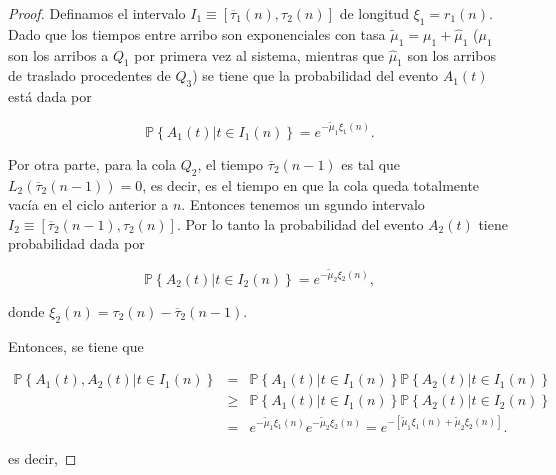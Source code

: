 \documentclass{article}
\newcommand{\prob}{\mathbb{P}}
\numberwithin{equation}{section}
\begin{document}
{\begin{proof}
Definamos el intervalo $I_{1}\equiv\left[\overline{\tau}_{1}\left(n\right),\tau_{2}\left(n\right)\right]$ de longitud $\xi_{1}=r_{1}\left(n\right)$. Dado que los tiempos entre arribo son exponenciales con tasa $\tilde{\mu}_{1}=\mu_{1}+\hat{\mu}_{1}$ ($\mu_{1}$ son los arribos a $Q_{1}$ por primera vez al sistema, mientras que $\hat{\mu}_{1}$ son los arribos de traslado procedentes de $Q_{3}$) se tiene que la probabilidad del evento $A_{1}\left(t\right)$ est\'a dada por 

\begin{equation}
\prob\left\{A_{1}\left(t\right)|t\in I_{1}\left(n\right)\right\}=e^{-\tilde{\mu}_{1}\xi_{1}\left(n\right)}.
\end{equation} 

Por otra parte, para la cola $Q_{2}$, el tiempo $\overline{\tau}_{2}\left(n-1\right)$ es tal que $L_{2}\left(\overline{\tau}_{2}\left(n-1\right)\right)=0$, es decir, es el tiempo en que la cola queda totalmente vac\'ia en el ciclo anterior a $n$. Entonces tenemos un sgundo intervalo $I_{2}\equiv\left[\overline{\tau}_{2}\left(n-1\right),\tau_{2}\left(n\right)\right]$. Por lo tanto la probabilidad del evento $A_{2}\left(t\right)$ tiene probabilidad dada por

\begin{equation}
\prob\left\{A_{2}\left(t\right)|t\in I_{2}\left(n\right)\right\}=e^{-\tilde{\mu}_{2}\xi_{2}\left(n\right)},
\end{equation} 

donde $\xi_{2}\left(n\right)=\tau_{2}\left(n\right)-\overline{\tau}_{2}\left(n-1\right)$.



Entonces, se tiene que

\begin{eqnarray*}
\prob\left\{A_{1}\left(t\right),A_{2}\left(t\right)|t\in I_{1}\left(n\right)\right\}&=&
\prob\left\{A_{1}\left(t\right)|t\in I_{1}\left(n\right)\right\}
\prob\left\{A_{2}\left(t\right)|t\in I_{1}\left(n\right)\right\}\\
&\geq&
\prob\left\{A_{1}\left(t\right)|t\in I_{1}\left(n\right)\right\}
\prob\left\{A_{2}\left(t\right)|t\in I_{2}\left(n\right)\right\}\\
&=&e^{-\tilde{\mu}_{1}\xi_{1}\left(n\right)}e^{-\tilde{\mu}_{2}\xi_{2}\left(n\right)}
=e^{-\left[\tilde{\mu}_{1}\xi_{1}\left(n\right)+\tilde{\mu}_{2}\xi_{2}\left(n\right)\right]}.
\end{eqnarray*}


es decir, 


\end{proof}}
\end{document}
